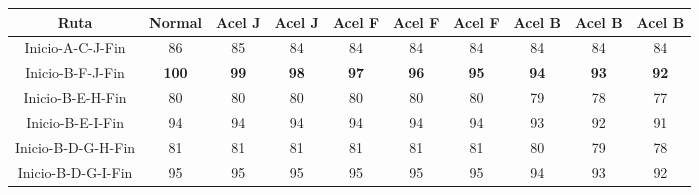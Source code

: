 \begin{tabular}{cccccccccc}
\textbf{Ruta} & \textbf{Normal} & \textbf{Acel J} & \textbf{Acel J} & \textbf{Acel F} & \textbf{Acel F} & \textbf{Acel F} & \textbf{Acel B} & \textbf{Acel B} & \textbf{Acel B} \bigstrut[b]\\
\hline
\hline
Inicio-A-C-J-Fin & 86     & 85     & 84     & 84     & 84     & 84     & 84     & 84     & 84 \bigstrut[t]\\
Inicio-B-F-J-Fin & \textbf{100} & \textbf{99} & \textbf{98} & \textbf{97} & \textbf{96} & \textbf{95} & \textbf{94} & \textbf{93} & \textbf{92} \\
Inicio-B-E-H-Fin & 80     & 80     & 80     & 80     & 80     & 80     & 79     & 78     & 77 \\
Inicio-B-E-I-Fin & 94     & 94     & 94     & 94     & 94     & 94     & 93     & 92     & 91 \\
Inicio-B-D-G-H-Fin & 81     & 81     & 81     & 81     & 81     & 81     & 80     & 79     & 78 \\
Inicio-B-D-G-I-Fin & 95     & 95     & 95     & 95     & 95     & 95     & 94     & 93     & 92 \bigstrut[b]\\
\hline
\hline
\end{tabular}%
